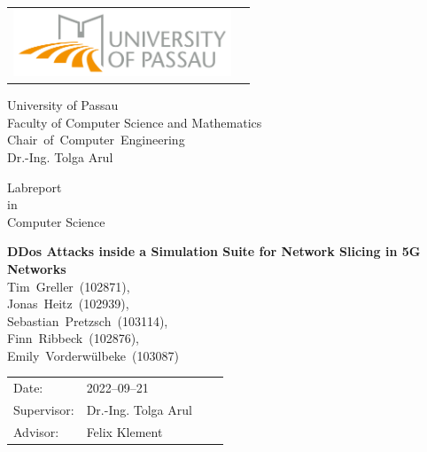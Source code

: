 \documentclass[fontsize=10pt,openright,oneside,paper=a4,BCOR=1cm,numbers=noenddot]{scrbook}
\newcommand{\authornamefirstone}{Tim}
\newcommand{\authornamelastone}{Greller}
\newcommand{\matrikelnummerone}{102871}
\newcommand{\authornamefirsttwo}{Jonas}
\newcommand{\authornamelasttwo}{Heitz}
\newcommand{\matrikelnummertwo}{102939}
\newcommand{\authornamefirstthree}{Sebastian}
\newcommand{\authornamelastthree}{Pretzsch}
\newcommand{\matrikelnummerthree}{103114}
\newcommand{\authornamefirstfour}{Finn}
\newcommand{\authornamelastfour}{Ribbeck}
\newcommand{\matrikelnummerfour}{102876}
\newcommand{\authornamefirstfive}{Emily}
\newcommand{\authornamelastfive}{Vorderwülbeke}
\newcommand{\matrikelnummerfive}{103087}
\newcommand{\worktitle}{DDos Attacks inside a Simulation Suite for Network Slicing in 5G Networks}
\newcommand{\thesistype}{Labreport}
\newcommand{\courseofstudies}{Computer Science}
\newcommand{\thesisdate}{2022--09--21}   %
\newcommand{\thesisprof}{Dr.-Ing. Tolga Arul}
\newcommand{\chair}{\mbox{Chair of Computer Engineering}}
\newcommand{\advisor}{Felix Klement}
\begin{document}
\frontmatter
\thispagestyle{empty}
\newpage

\vspace{1cm}

\begin{center}
\begin{tabular}{lr}
\includegraphics[width=6.5cm]{img/logouni_en.png}
\end{tabular}

\vspace{3cm}
\Large University of Passau
\\
\Large Faculty of Computer Science and Mathematics
\\
\vspace{0.3cm}
\Large {\chair }
\\
\Large \thesisprof

\end{center}


\vspace{2.5cm}

\begin{center}
        {\Large \thesistype\\ in \\ \courseofstudies} 
\end{center}

\begin{center}
        \settowidth{\baselineskip}{0.4cm}
        {\LARGE \textbf{\worktitle}}
        \\
        {\Large
        \vspace{1cm}
        \authornamefirstone~\authornamelastone~(\matrikelnummerone), \\
        \authornamefirsttwo~\authornamelasttwo~(\matrikelnummertwo), \\
        \authornamefirstthree~\authornamelastthree~(\matrikelnummerthree), \\
        \authornamefirstfour~\authornamelastfour~(\matrikelnummerfour), \\
        \authornamefirstfive~\authornamelastfive~(\matrikelnummerfive) \\
        }
\end{center}

\vfill {%

\vfill


{\large
\begin{tabular}[l]{llll}

Date:       & \thesisdate %
\smallskip \\
Supervisor:   & \thesisprof \\
Advisor: & \advisor \\
\end{tabular}}
} \cleardoublepage
\end{document}
